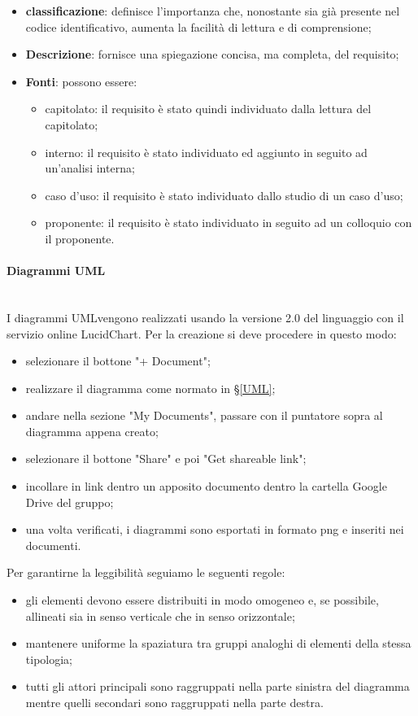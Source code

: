 		\begin{itemize}
			\item \textbf{classificazione}: definisce l'importanza che, nonostante sia già presente nel codice identificativo, aumenta la facilità di lettura e di comprensione;
			\item \textbf{Descrizione}: fornisce una spiegazione concisa, ma completa, del requisito;
			\item \textbf{Fonti}: possono essere:
			\begin{itemize}
				\item capitolato\glo: il requisito è stato quindi individuato dalla lettura del capitolato\glo;
				\item interno: il requisito è stato individuato ed aggiunto in seguito ad un'analisi interna;
				\item caso d'uso\glo: il requisito è stato individuato dallo studio di un caso d'uso\glo;
				\item proponente: il requisito è stato individuato in seguito ad un colloquio con il proponente.
			\end{itemize}
		\end{itemize}
		\paragraph*{Diagrammi UML}\mbox{}\\ [1mm]
		\label{UML}
		I diagrammi UML\glosp vengono realizzati usando la versione 2.0 del linguaggio con il servizio online LucidChart. Per la creazione si deve procedere in questo modo: 
		\begin{itemize}
			\item selezionare il bottone "+ Document";
			\item realizzare il diagramma come normato in §\ref{UML};
			\item andare nella sezione "My Documents", passare con il puntatore sopra al diagramma appena creato;
			\item selezionare il bottone "Share" e poi "Get shareable link";
			\item incollare in link dentro un apposito documento dentro la cartella Google Drive del gruppo;
			\item una volta verificati, i diagrammi sono esportati in formato png e inseriti nei documenti.
		\end{itemize}
		Per garantirne la leggibilità seguiamo le seguenti regole:
		\begin{itemize}
			\item gli elementi devono essere distribuiti in modo omogeneo e, se possibile, allineati sia in senso verticale che in senso orizzontale;
			\item mantenere uniforme la spaziatura tra gruppi analoghi di elementi della stessa tipologia;
			\item tutti gli attori principali sono raggruppati nella parte sinistra del diagramma mentre quelli secondari sono raggruppati nella parte destra.
		\end{itemize}
		
